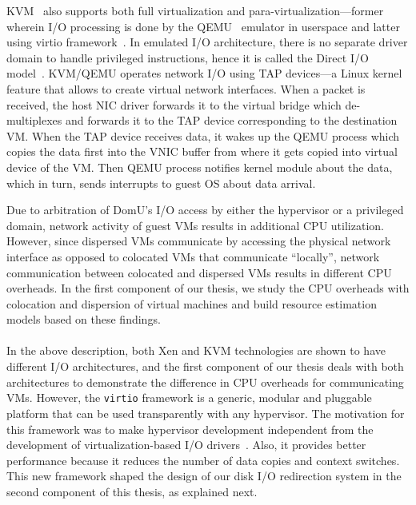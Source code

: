 KVM~\cite{kvm} also supports both full virtualization and
para-virtualization---former wherein I/O
processing is done by the QEMU~\cite{qemu} emulator in 
userspace\cite{kvm-whitepaper}
and latter using virtio framework~\cite{virtio}.
In emulated I/O architecture, there is no separate driver domain to handle 
privileged instructions, hence it is called 
the Direct I/O model~\cite{net-fairness-visa-2010}.
KVM/QEMU operates network I/O using TAP devices---a Linux kernel feature
that allows to create virtual network interfaces. When a packet is received,
the host NIC driver forwards it to the virtual bridge which de-multiplexes
and forwards it to the TAP device corresponding to the destination VM. 
When the TAP device receives data, it wakes up the QEMU process which
copies the data first into the VNIC buffer from where it gets copied 
into virtual device of the VM. Then QEMU process notifies kernel module
about the data, which in turn, sends interrupts to guest OS about data arrival.

Due to arbitration of DomU's I/O access by either the hypervisor or a
privileged domain, network activity of guest VMs results in additional
CPU utilization. However, since dispersed VMs communicate
by accessing the physical network interface as opposed to colocated VMs
that communicate ``locally'', network communication between
colocated and dispersed VMs results in different CPU overheads.
In the first component of our thesis, we study the CPU overheads
with colocation and dispersion of virtual machines and
build resource estimation models based on these findings.
\\
\\
In the above description, both Xen and KVM technologies are shown to 
have different I/O architectures, and the first component of our 
thesis deals with both architectures to demonstrate the difference
in CPU overheads for communicating VMs.
However, the \texttt{virtio} framework 
is a generic, modular and pluggable 
platform that can be used transparently with 
any hypervisor. The motivation for this framework was to
make hypervisor development
independent from the development of virtualization-based 
I/O drivers~\cite{virtio}. Also, it provides better performance
because it reduces the number of data copies and context switches.
This new framework shaped the design of our disk I/O redirection system
in the second component of this thesis, as explained next.

